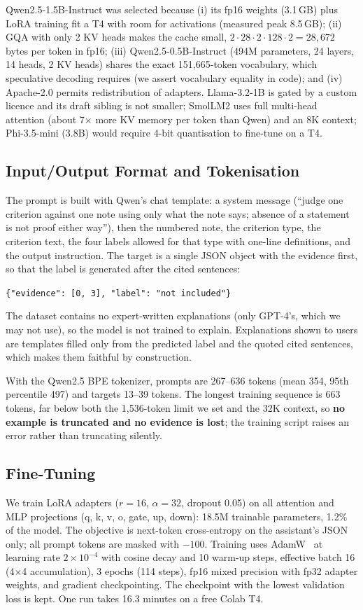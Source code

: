 \documentclass[conference]{IEEEtran}
\begin{document}
Qwen2.5-1.5B-Instruct was selected because (i) its fp16 weights (3.1\,GB) plus LoRA training fit a T4 with room for activations (measured peak 8.5\,GB); (ii) GQA with only 2 KV heads makes the cache small, $2 \cdot 28 \cdot 2 \cdot 128 \cdot 2 = 28{,}672$ bytes per token in fp16; (iii) Qwen2.5-0.5B-Instruct (494M parameters, 24 layers, 14 heads, 2 KV heads) shares the exact 151,665-token vocabulary, which speculative decoding requires (we assert vocabulary equality in code); and (iv) Apache-2.0 permits redistribution of adapters. Llama-3.2-1B is gated by a custom licence and its draft sibling is not smaller; SmolLM2 uses full multi-head attention (about 7$\times$ more KV memory per token than Qwen) and an 8K context; Phi-3.5-mini (3.8B) would require 4-bit quantisation to fine-tune on a T4.

\subsection{Input/Output Format and Tokenisation}
The prompt is built with Qwen's chat template: a system message (``judge one criterion against one note using only what the note says; absence of a statement is not proof either way''), then the numbered note, the criterion type, the criterion text, the four labels allowed for that type with one-line definitions, and the output instruction. The target is a single JSON object with the evidence first, so that the label is generated after the cited sentences:
\begin{center}\small\texttt{\{"evidence": [0, 3], "label": "not included"\}}\end{center}
The dataset contains no expert-written explanations (only GPT-4's, which we may not use), so the model is not trained to explain. Explanations shown to users are templates filled only from the predicted label and the quoted cited sentences, which makes them faithful by construction.

With the Qwen2.5 BPE tokenizer, prompts are 267--636 tokens (mean 354, 95th percentile 497) and targets 13--39 tokens. The longest training sequence is 663 tokens, far below both the 1,536-token limit we set and the 32K context, so \textbf{no example is truncated and no evidence is lost}; the training script raises an error rather than truncating silently.

\subsection{Fine-Tuning}
We train LoRA adapters ($r{=}16$, $\alpha{=}32$, dropout 0.05) on all attention and MLP projections (q, k, v, o, gate, up, down): 18.5M trainable parameters, 1.2\% of the model. The objective is next-token cross-entropy on the assistant's JSON only; all prompt tokens are masked with $-100$. Training uses AdamW~\cite{adamw} at learning rate $2\times10^{-4}$ with cosine decay and 10 warm-up steps, effective batch 16 (4$\times$4 accumulation), 3 epochs (114 steps), fp16 mixed precision with fp32 adapter weights, and gradient checkpointing. The checkpoint with the lowest validation loss is kept. One run takes 16.3 minutes on a free Colab T4.
\end{document}
